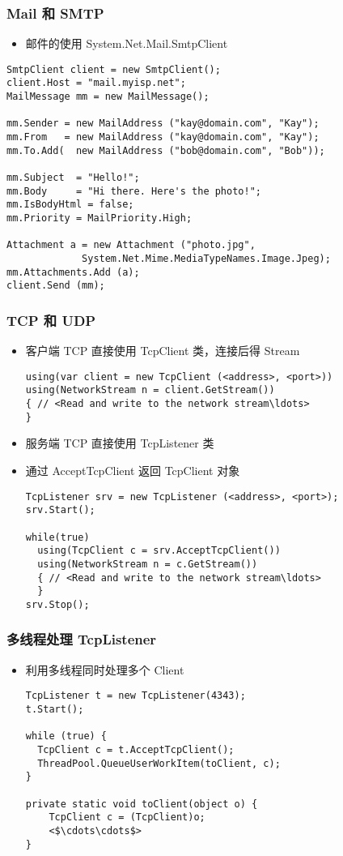 \begin{frame}[fragile]
\frametitle{Mail 和 SMTP}

\begin{itemize}
\item 邮件的使用 System.Net.Mail.SmtpClient
\end{itemize}
\begin{lstlisting}
SmtpClient client = new SmtpClient();
client.Host = "mail.myisp.net";
MailMessage mm = new MailMessage();

mm.Sender = new MailAddress ("kay@domain.com", "Kay");
mm.From   = new MailAddress ("kay@domain.com", "Kay");
mm.To.Add(  new MailAddress ("bob@domain.com", "Bob"));

mm.Subject  = "Hello!";
mm.Body     = "Hi there. Here's the photo!";
mm.IsBodyHtml = false;
mm.Priority = MailPriority.High;

Attachment a = new Attachment ("photo.jpg",
             System.Net.Mime.MediaTypeNames.Image.Jpeg);
mm.Attachments.Add (a);
client.Send (mm);
\end{lstlisting}
\end{frame}

\begin{frame}[fragile]
\frametitle{TCP 和 UDP}
\begin{itemize}
\item 客户端 TCP 直接使用 TcpClient 类，连接后得 Stream
\begin{lstlisting}[escapeinside=<>]
using(var client = new TcpClient (<address>, <port>))
using(NetworkStream n = client.GetStream())
{ // <Read and write to the network stream\ldots>
}
\end{lstlisting}
\item 服务端 TCP 直接使用 TcpListener 类
\item 通过 AcceptTcpClient 返回 TcpClient 对象
\begin{lstlisting}[escapeinside=<>]
TcpListener srv = new TcpListener (<address>, <port>);
srv.Start();

while(true)
  using(TcpClient c = srv.AcceptTcpClient())
  using(NetworkStream n = c.GetStream())
  { // <Read and write to the network stream\ldots>
  }
srv.Stop();
\end{lstlisting}
\end{itemize} 
\end{frame}

\begin{frame}[fragile]
\frametitle{多线程处理 TcpListener}
\begin{itemize}
\item 利用多线程同时处理多个 Client 
\begin{lstlisting}[escapeinside=<>]
TcpListener t = new TcpListener(4343);
t.Start();

while (true) {
  TcpClient c = t.AcceptTcpClient();
  ThreadPool.QueueUserWorkItem(toClient, c);
}

private static void toClient(object o) {
    TcpClient c = (TcpClient)o;
    <$\cdots\cdots$>
}
\end{lstlisting}
\end{itemize}
\end{frame}

